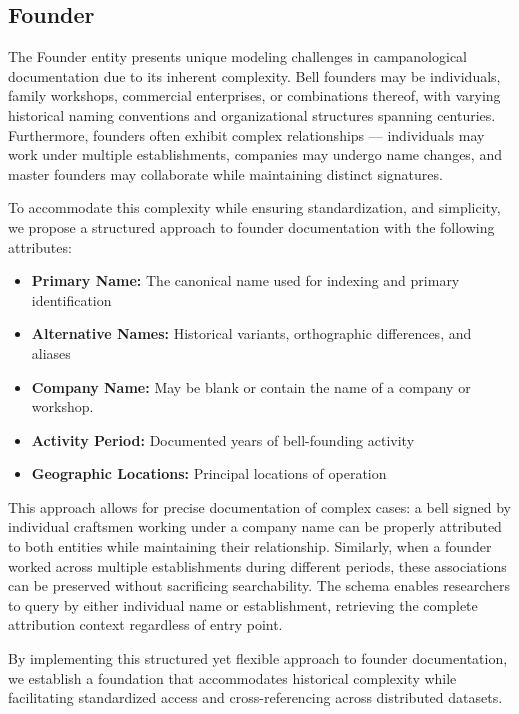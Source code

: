 \documentclass[11pt, a4paper]{article}
\begin{document}
\subsection{Founder}

The Founder entity presents unique modeling challenges in campanological documentation due to its inherent complexity. 
Bell founders may be individuals, family workshops, commercial enterprises, or combinations thereof, with varying historical 
naming conventions and organizational structures spanning centuries. Furthermore, founders often exhibit complex 
relationships — individuals may work under multiple establishments, companies may undergo name changes, and master founders 
may collaborate while maintaining distinct signatures.

To accommodate this complexity while ensuring standardization, and simplicity, we propose a structured approach to founder documentation with the following attributes:

\begin{itemize}
    \item \textbf{Primary Name:} The canonical name used for indexing and primary identification
    \item \textbf{Alternative Names:} Historical variants, orthographic differences, and aliases
    \item \textbf{Company Name:} May be blank or contain the name of a company or workshop.
    \item \textbf{Activity Period:} Documented years of bell-founding activity
    \item \textbf{Geographic Locations:} Principal locations of operation
\end{itemize}

This approach allows for precise documentation of complex cases: a bell signed by individual craftsmen working under a company name can be properly attributed to both entities while maintaining their relationship. Similarly, when a founder worked across multiple establishments during different periods, these associations can be preserved without sacrificing searchability. The schema enables researchers to query by either individual name or establishment, retrieving the complete attribution context 
regardless of entry point.

By implementing this structured yet flexible approach to founder documentation, we establish a foundation that accommodates 
historical complexity while facilitating standardized access and cross-referencing across distributed datasets.
\end{document}
